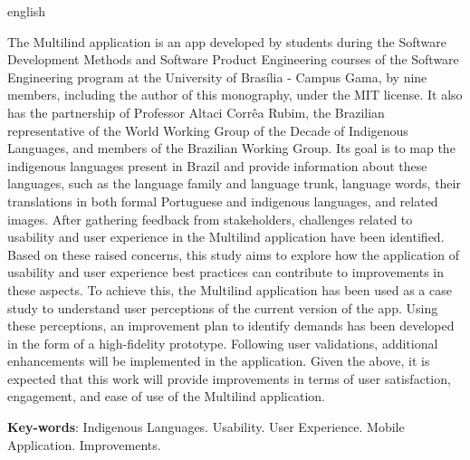 \begin{resumo}[Abstract]
 \begin{otherlanguage*}{english}
   
  The Multilind application is an app developed by students during the Software Development Methods and Software Product Engineering courses of the Software Engineering program at the University of Brasília - Campus Gama, 
  by nine members, including the author of this monography, under the MIT license. It also has the partnership of Professor Altaci Corrêa Rubim, the Brazilian representative of the World Working Group of the Decade 
  of Indigenous Languages, and members of the Brazilian Working Group. Its goal is to map the indigenous languages present in Brazil and provide information about these languages, such as the language family and 
  language trunk, language words, their translations in both formal Portuguese and indigenous languages, and related images. After gathering feedback from stakeholders, challenges related to usability and user experience 
  in the Multilind application have been identified. Based on these raised concerns, this study aims to explore how the application of usability and user experience best practices can contribute to improvements in these aspects. 
  To achieve this, the Multilind application has been used as a case study to understand user perceptions of the current version of the app. Using these perceptions, an improvement plan to identify demands has been developed 
  in the form of a high-fidelity prototype. Following user validations, additional enhancements will be implemented in the application. Given the above, it is expected 
  that this work will provide improvements in terms of user satisfaction, engagement, and ease of use of the Multilind application.


   \vspace{\onelineskip}
 
   \noindent 
   \textbf{Key-words}: Indigenous Languages. Usability. User Experience. Mobile Application. Improvements.
 \end{otherlanguage*}
\end{resumo}
